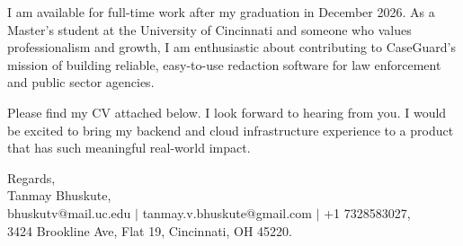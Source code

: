 \documentclass[11pt]{letter}
\begin{document}
\begin{letter}{}
I am available for full-time work after my graduation in December 2026. As a Master's student at the University of Cincinnati and someone who values professionalism and growth, I am enthusiastic about contributing to CaseGuard's mission of building reliable, easy-to-use redaction software for law enforcement and public sector agencies.

Please find my CV attached below. I look forward to hearing from you. I would be excited to bring my backend and cloud infrastructure experience to a product that has such meaningful real-world impact.

{\setlength{\parskip}{0pt}
Regards,\\
Tanmay Bhuskute,\\
bhuskutv@mail.uc.edu $\mid$ tanmay.v.bhuskute@gmail.com $\mid$ +1 7328583027,\\
3424 Brookline Ave, Flat 19, Cincinnati, OH 45220.
}

\end{letter}
\end{document}
